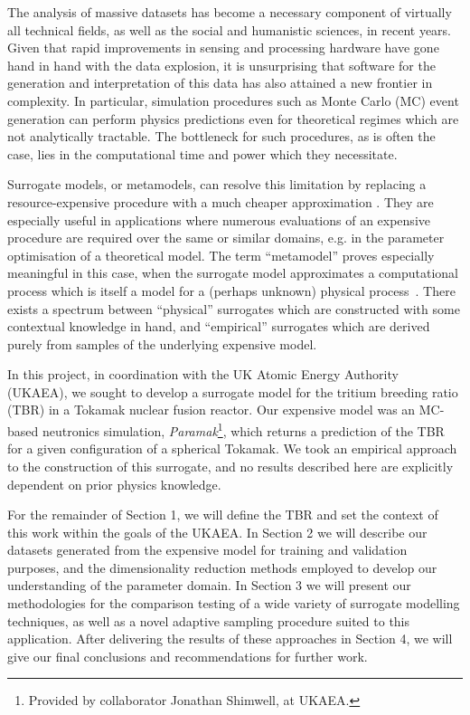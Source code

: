 
The analysis of massive datasets has become a necessary component of virtually all technical fields, as well as the social and humanistic sciences, in recent years. Given that rapid improvements in sensing and processing hardware have gone hand in hand with the data explosion, it is unsurprising that software for the generation and interpretation of this data has also attained a new frontier in complexity. In particular, simulation procedures such as Monte Carlo (MC) event generation can perform physics predictions even for theoretical regimes which are not analytically tractable. The bottleneck for such procedures, as is often the case, lies in the computational time and power which they necessitate.

Surrogate models, or metamodels, can resolve this limitation by replacing a
resource-expensive procedure with a much cheaper approximation
\cite{Sondergaard2003}. They are especially useful in applications where
numerous evaluations of an expensive procedure are required over the same or
similar domains, e.g. in the parameter optimisation of a theoretical model. The
term ``metamodel'' proves especially meaningful in this case, when the surrogate
model approximates a computational process which is itself a model for a
(perhaps unknown) physical process~\cite{Myers2002}. There exists a spectrum
between ``physical'' surrogates which are constructed with some contextual
knowledge in hand, and ``empirical'' surrogates which are derived purely from
samples of the underlying expensive model.

In this project, in coordination with the UK Atomic Energy Authority (UKAEA), we sought to develop a surrogate model for the tritium breeding ratio (TBR) in a Tokamak nuclear fusion reactor. Our expensive model was an MC-based neutronics simulation, \textit{Paramak}\footnote{Provided by collaborator Jonathan Shimwell, at UKAEA.}, which returns a prediction of the TBR for a given configuration of a spherical Tokamak. We took an empirical approach to the construction of this surrogate, and no results described here are explicitly dependent on prior physics knowledge.

For the remainder of Section 1, we will define the TBR and set the context of this work within the goals of the UKAEA. In Section 2 we will describe our datasets generated from the expensive model for training and validation purposes, and the dimensionality reduction methods employed to develop our understanding of the parameter domain. In Section 3 we will present our methodologies for the comparison testing of a wide variety of surrogate modelling techniques, as well as a novel adaptive sampling procedure suited to this application. After delivering the results of these approaches in Section 4, we will give our final conclusions and recommendations for further work.

